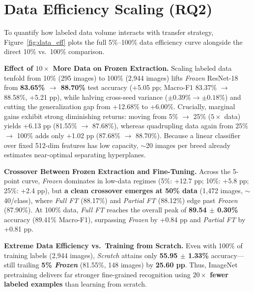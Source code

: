 \documentclass[sigconf,nonacm]{acmart}
\begin{document}
\section{Data Efficiency Scaling (RQ2)}
To quantify how labeled data volume interacts with transfer strategy, Figure~\ref{fig:data_eff} plots the full 5\%--100\% data efficiency curve alongside the direct 10\% vs.\ 100\% comparison.

\textbf{Effect of $10\times$ More Data on Frozen Extraction.} Scaling labeled data tenfold from 10\% (295 images) to 100\% (2,944 images) lifts \emph{Frozen} ResNet-18 from \textbf{83.65\% $\to$ 88.70\%} test accuracy (+5.05 pp; Macro-F1 83.37\% $\to$ 88.58\%, +5.21 pp), while halving cross-seed variance ($\pm 0.39\% \to \pm 0.18\%$) and cutting the generalization gap from +12.68\% to +6.00\%. Crucially, marginal gains exhibit strong diminishing returns: moving from 5\% $\to$ 25\% ($5\times$ data) yields +6.13 pp (81.55\% $\to$ 87.68\%), whereas quadrupling data again from 25\% $\to$ 100\% adds only +1.02 pp (87.68\% $\to$ 88.70\%). Because a linear classifier over fixed 512-dim features has low capacity, $\sim$20 images per breed already estimates near-optimal separating hyperplanes.

\textbf{Crossover Between Frozen Extraction and Fine-Tuning.} Across the 5-point curve, \emph{Frozen} dominates in low-data regimes (5\%: +12.7 pp; 10\%: +5.8 pp; 25\%: +2.4 pp), but \textbf{a clean crossover emerges at 50\% data} (1,472 images, $\sim$40/class), where \emph{Full FT} (88.17\%) and \emph{Partial FT} (88.12\%) edge past \emph{Frozen} (87.90\%). At 100\% data, \emph{Full FT} reaches the overall peak of \textbf{89.54 $\pm$ 0.30\%} accuracy (89.41\% Macro-F1), surpassing \emph{Frozen} by +0.84 pp and \emph{Partial FT} by +0.81 pp.

\textbf{Extreme Data Efficiency vs.\ Training from Scratch.} Even with 100\% of training labels (2,944 images), \emph{Scratch} attains only \textbf{55.95 $\pm$ 1.33\%} accuracy---still trailing \textbf{5\% \emph{Frozen}} (81.55\%, 148 images) by \textbf{25.60 pp}. Thus, ImageNet pretraining delivers far stronger fine-grained recognition using \textbf{$20\times$ fewer labeled examples} than learning from scratch.
\end{document}
